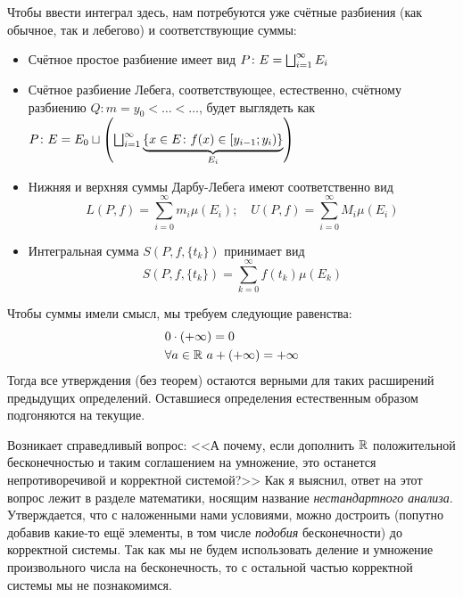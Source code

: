 \begin{note}
	Чтобы ввести интеграл здесь, нам потребуются уже счётные разбиения (как обычное, так и лебегово) и соответствующие суммы:
	\begin{itemize}
		\item Счётное простое разбиение имеет вид $P \colon E = \bigsqcup_{i = 1}^\infty E_i$
		
		\item Счётное разбиение Лебега, соответствующее, естественно, счётному разбиению $Q \colon m = y_0 < \ldots < \ldots$, будет выглядеть как $P \colon E = E_0 \sqcup \left(\bigsqcup_{i = 1}^\infty \underbrace{\{x \in E \colon f(x) \in \left[y_{i - 1}; y_i\right)\}}_{E_i}\right)$
		
		\item Нижняя и верхняя суммы Дарбу-Лебега имеют соответственно вид
		\[
			L(P, f) = \sum_{i = 0}^\infty m_i \mu(E_i); \quad U(P, f) = \sum_{i = 0}^\infty M_i \mu(E_i)
		\]
		
		\item Интегральная сумма $S(P, f, \{t_k\})$ принимает вид
		\[
			S(P, f, \{t_k\}) = \sum_{k = 0}^\infty f(t_k) \mu(E_k)
		\]
	\end{itemize}
\end{note}

\begin{note}
	Чтобы суммы имели смысл, мы требуем следующие равенства:
	\begin{align*}
		&{0 \cdot (+\infty) = 0}
		\\
		&{\forall a \in \mathbb{R}\ a + (+\infty) = +\infty}
	\end{align*}
	Тогда все утверждения (без теорем) остаются верными для таких расширений предыдущих определений. Оставшиеся определения естественным образом подгоняются на текущие.
\end{note}

\begin{anote}
	Возникает справедливый вопрос: <<А почему, если дополнить $\mathbb{R}$ положительной бесконечностью и таким соглашением на умножение, это останется непротиворечивой и корректной системой?>> Как я выяснил, ответ на этот вопрос лежит в разделе математики, носящим название \textit{нестандартного анализа}. Утверждается, что с наложенными нами условиями, можно достроить (попутно добавив какие-то ещё элементы, в том числе \textit{подобия} бесконечности) до корректной системы. Так как мы не будем использовать деление и умножение произвольного числа на бесконечность, то с остальной частью корректной системы мы не познакомимся.
\end{anote}

